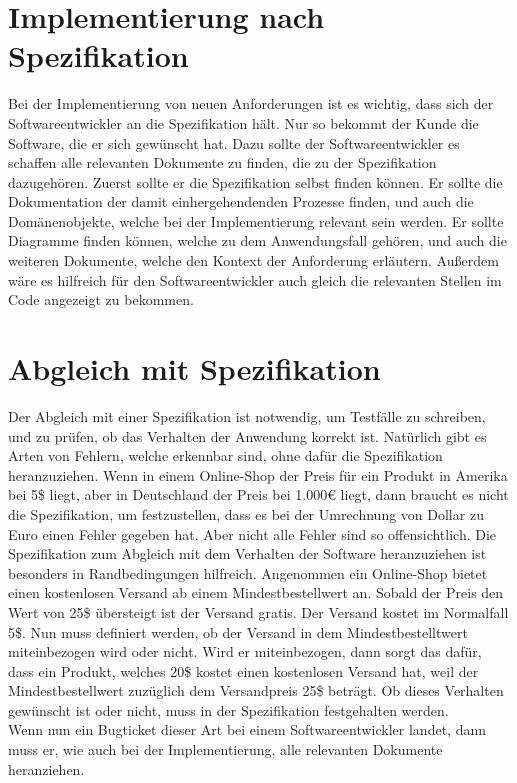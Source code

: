 \section{Implementierung nach Spezifikation}
Bei der Implementierung von neuen Anforderungen ist es wichtig, dass sich der Softwareentwickler an die Spezifikation hält.
Nur so bekommt der Kunde die Software, die er sich gewünscht hat.
Dazu sollte der Softwareentwickler es schaffen alle relevanten Dokumente zu finden, die zu der Spezifikation dazugehören.
Zuerst sollte er die Spezifikation selbst finden können.
Er sollte die Dokumentation der damit einhergehendenden Prozesse finden, und auch die Domänenobjekte, welche bei der Implementierung relevant sein werden.
Er sollte Diagramme finden können, welche zu dem Anwendungsfall gehören, und auch die weiteren Dokumente, welche den Kontext der Anforderung erläutern.
Außerdem wäre es hilfreich für den Softwareentwickler auch gleich die relevanten Stellen im Code angezeigt zu bekommen.

\section{Abgleich mit Spezifikation}
Der Abgleich mit einer Spezifikation ist notwendig, um Testfälle zu schreiben, und zu prüfen, ob das Verhalten der Anwendung korrekt ist.
Natürlich gibt es Arten von Fehlern, welche erkennbar sind, ohne dafür die Spezifikation heranzuziehen.
Wenn in einem Online-Shop der Preis für ein Produkt in Amerika bei 5\$ liegt, aber in Deutschland der Preis bei 1.000€ liegt, dann braucht es nicht die Spezifikation, um festzustellen, dass es bei der Umrechnung von Dollar zu Euro einen Fehler gegeben hat.
Aber nicht alle Fehler sind so offensichtlich.
Die Spezifikation zum Abgleich mit dem Verhalten der Software heranzuziehen ist besonders in Randbedingungen hilfreich.
Angenommen ein Online-Shop bietet einen kostenlosen Versand ab einem Mindestbestellwert an.
Sobald der Preis den Wert von 25\$ übersteigt ist der Versand gratis.
Der Versand kostet im Normalfall 5\$.
Nun muss definiert werden, ob der Versand in dem Mindestbestelltwert miteinbezogen wird oder nicht.
Wird er miteinbezogen, dann sorgt das dafür, dass ein Produkt, welches 20\$ kostet einen kostenlosen Versand hat, weil der Mindestbestellwert zuzüglich dem Versandpreis 25\$ beträgt.
Ob dieses Verhalten gewünscht ist oder nicht, muss in der Spezifikation festgehalten werden.\\

Wenn nun ein Bugticket dieser Art bei einem Softwareentwickler landet, dann muss er, wie auch bei der Implementierung, alle relevanten Dokumente heranziehen.

